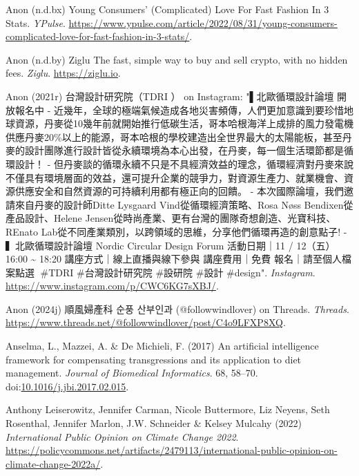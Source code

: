\documentclass[
  letterpaper,
  DIV=11,
  numbers=noendperiod]{scrartcl}
\newlength{\cslhangindent}
\newenvironment{CSLReferences}[2] %
 {\begin{list}{}{%
  \setlength{\itemindent}{0pt}
  \setlength{\leftmargin}{0pt}
  \setlength{\parsep}{0pt}
  \ifodd #1
   \setlength{\leftmargin}{\cslhangindent}
   \setlength{\itemindent}{-1\cslhangindent}
  \fi
  \setlength{\itemsep}{#2\baselineskip}}}
 {\end{list}}
\begin{document}
\begin{CSLReferences}{0}{1}
Anon (n.d.bx) Young {Consumers}' ({Complicated}) {Love For Fast Fashion
In} 3 {Stats}. \emph{YPulse}.
\url{https://www.ypulse.com/article/2022/08/31/young-consumers-complicated-love-for-fast-fashion-in-3-stats/}.

Anon (n.d.by) Ziglu {\textbar} {The} fast, simple way to buy and sell
crypto, with no hidden fees. \emph{Ziglu}. \url{https://ziglu.io}.

Anon (2021r) 台灣設計研究院（{TDRI} ） on {Instagram}:
"▌北歐循環設計論壇 {\textbar} 開放報名中 -
近幾年，全球的極端氣候造成各地災害頻傳，人們更加意識到要珍惜地球資源，丹麥從10幾年前就開始推行低碳生活，哥本哈根海洋上成排的風力發電機供應丹麥20\%以上的能源，哥本哈根的學校建造出全世界最大的太陽能板，甚至丹麥的設計團隊進行設計皆從永續環境為本心出發，在丹麥，每一個生活環節都是循環設計！
-
但丹麥談的循環永續不只是不具經濟效益的理念，循環經濟對丹麥來說不僅具有環境層面的效益，還可提升企業的競爭力，對資源生產力、就業機會、資源供應安全和自然資源的可持續利用都有極正向的回饋。
- 本次國際論壇，{我們邀請來自丹麥的設計師Ditte Lysgaard
Vind從循環經濟策略}、{Rosa N{ø}ss Bendixen從產品設計}、{Helene
Jensen從時尚產業}、更有台灣的團隊奇想創造、光寶科技、{REnato}
Lab從不同產業類別，以跨領域的思維，分享他們循環再造的創意點子! -
▍北歐循環設計論壇 {Nordic Circular Design Forum} 活動日期｜11 /
12（五）16:00 {\textasciitilde{}} 18:20 講座方式｜線上直播與線下參與
講座費用｜免費 報名｜請至個人檔案點選🔗 \#{TDRI} \#台灣設計研究院
\#設研院 \#設計 \#design". \emph{Instagram}.
\url{https://www.instagram.com/p/CWC6KG7sXBJ/}.

Anon (2024j) 順風婦產科 순풍 산부인과 (@followwindlover) on {Threads}.
\emph{Threads}.
\url{https://www.threads.net/@followwindlover/post/C4o9LFXP8XQ}.

Anselma, L., Mazzei, A. \& De Michieli, F. (2017) An artificial
intelligence framework for compensating transgressions and its
application to diet management. \emph{Journal of Biomedical
Informatics}. 68, 58--70.
doi:\href{https://doi.org/10.1016/j.jbi.2017.02.015}{10.1016/j.jbi.2017.02.015}.

Anthony Leiserowitz, Jennifer Carman, Nicole Buttermore, Liz Neyens,
Seth Rosenthal, Jennifer Marlon, J.W. Schneider \& Kelsey Mulcahy (2022)
\emph{International {Public Opinion} on {Climate Change} 2022}.
\url{https://policycommons.net/artifacts/2479113/international-public-opinion-on-climate-change-2022a/}.


\end{CSLReferences}
\end{document}
